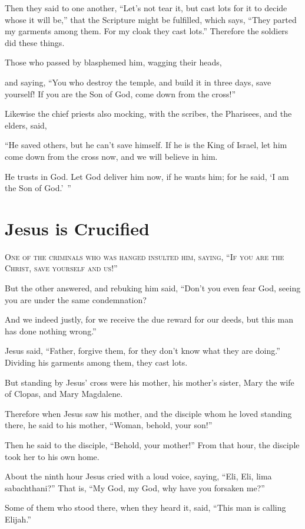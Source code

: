 Then they said to one another, “Let’s not tear it, but cast lots for it to decide whose it will be,” that the Scripture might be fulfilled, which says, “They parted my garments among them. For my cloak they cast lots.” Therefore the soldiers did these things.

Those who passed by blasphemed him, wagging their heads,

and saying, “You who destroy the temple, and build it in three days, save yourself! If you are the Son of God, come down from the cross!”

Likewise the chief priests also mocking, with the scribes, the Pharisees, and the elders, said,

“He saved others, but he can’t save himself. If he is the King of Israel, let him come down from the cross now, and we will believe in him.

He trusts in God. Let God deliver him now, if he wants him; for he said, ‘I am the Son of God.’ ”


\clearpage \section*{Jesus is Crucified}

\lettrine{O}{ne of the criminals who was hanged insulted him, saying, “If you are the Christ, save yourself and us!”}

But the other answered, and rebuking him said, “Don’t you even fear God, seeing you are under the same condemnation?

And we indeed justly, for we receive the due reward for our deeds, but this man has done nothing wrong.”

Jesus said, “Father, forgive them, for they don’t know what they are doing.” Dividing his garments among them, they cast lots.

But standing by Jesus’ cross were his mother, his mother’s sister, Mary the wife of Clopas, and Mary Magdalene.

Therefore when Jesus saw his mother, and the disciple whom he loved standing there, he said to his mother, “Woman, behold, your son!”

Then he said to the disciple, “Behold, your mother!” From that hour, the disciple took her to his own home.

About the ninth hour Jesus cried with a loud voice, saying, “Eli, Eli, lima sabachthani?”  That is, “My God, my God, why have you forsaken me?”

Some of them who stood there, when they heard it, said, “This man is calling Elijah.”

